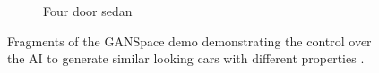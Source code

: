 \begin{figure}
\begin{subfigure}{.45\textwidth}
  \caption{Four door sedan}
  \label{fig:fourdoor}
\end{subfigure}
\captionsetup{width=.85\linewidth}
\caption{Fragments of the GANSpace demo demonstrating the control over the AI to generate similar looking cars with different properties \citep{ganspacevid}.}
\label{fig:ganspace}
\end{figure}